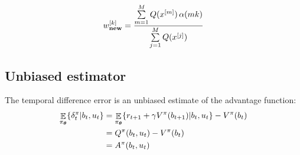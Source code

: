 \begin{equation}
  w^{[k]}_{\textrm{\textbf{new}}} = \frac{\sum\limits_{m=1}^{M} Q(x^{[m]})\, \alpha(mk)}{\sum\limits_{j=1}^{M} Q(x^{[j]})}
\end{equation}


\subsection{Unbiased estimator}\label{app:unbiased_delta}

The temporal difference error is an unbiased estimate of the advantage function:
\begin{align}
  \displaystyle \mathop \mathbb{E}_{\pi_{\boldsymbol{\theta}}} \{ \delta^{\pi}_t|b_t,u_t\} &=  \mathop\mathbb{E}_{\pi_{\boldsymbol{\theta}}}\{ r_{t+1} + \gamma V^{\pi}(b_{t+1})|b_t,u_t\} - V^{\pi}(b_t) \nonumber \\
									   &= Q^{\pi}(b_t,u_t) - V^{\pi}(b_t) \nonumber \\
									   &= A^{\pi}(b_t,u_t)
\end{align}
